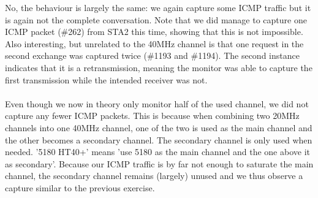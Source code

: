 No, the behaviour is largely the same: we again capture some ICMP traffic but it is again not the complete conversation. Note that we did manage to capture one ICMP packet (\#262) from STA2 this time, showing that this is not impossible. Also interesting, but unrelated to the 40MHz channel is that one request in the second exchange was captured twice (\#1193 and \#1194). The second instance indicates that it is a retransmission, meaning the monitor was able to capture the first transmission while the intended receiver was not. \\ \\
%
Even though we now in theory only monitor half of the used channel, we did not capture any fewer ICMP packets. This is because when combining two 20MHz channels into one 40MHz channel, one of the two is used as the main channel and the other becomes a secondary channel. The secondary channel is only used when needed. '5180 HT40+' means 'use 5180 as the main channel and the one above it as secondary'.
%
Because our ICMP traffic is by far not enough to saturate the main channel, the secondary channel remains (largely) unused and we thus observe a capture similar to the previous exercise.
